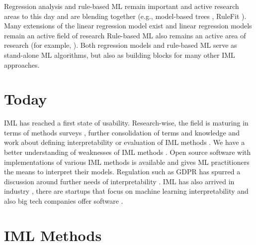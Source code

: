 \documentclass[runningheads]{llncs}
\begin{document}
Regression analysis and rule-based ML remain important and active research areas to this day and are blending together (e.g., model-based trees \cite{zeileis2008model}, RuleFit \cite{friedman2008predictive}).
Many extensions of the linear regression model exist \cite{hastie1990generalized,fahrmeir2013multivariate,gelman2006data} and linear regression models remain an active field of research \cite{fasiolo2020scalable,caruana2015intelligible,fasiolo2020fast,ustun2016supersparse} 
Rule-based ML also remains an active area of research (for example, \cite{wang2015falling,letham2015interpretable,hothorn2015ctree}).
Both regression models and rule-based ML serve as stand-alone ML algorithms, but also as building blocks for many other IML approaches.

\section{Today}

IML has reached a first state of usability.
Research-wise, the field is maturing in terms of methods surveys  \cite{molnar2019,guidotti2018survey,vilone2020explainable,rosenfeld2019explainability,adadi2018peeking,anjomshoae2019explainable,du2019techniques,carvalho2019machine}, further consolidation of terms and knowledge \cite{hall2019systematic,doshi2017towards,murdoch2019definitions,samek2019towards,preece2018stakeholders,chromik2020taxonomy} and work about defining interpretability or evaluation of IML methods \cite{mohseni2018multidisciplinary,mohseni2018human,ribeiro2016should,hoffman2018metrics}.
We have a better understanding of weaknesses of IML methods \cite{laugel2019dangers,molnar2019,molnar2020pitfalls,hooker2019please,adebayo2018sanity,janzing2019feature,sundararajan2019many,strobl2007bias,strobl2008conditional,apley2016visualizing}.
Open source software  with implementations of various IML methods is available \cite{iml,biecek2018dalex,pedregosa2011scikit,klaise2020alibi,nori2019interpretml} and gives ML practitioners the means to interpret their models.
Regulation such as GDPR has spurred a discussion around further needs of interpretability \cite{wachter2017counterfactual}.
IML has also arrived in industry \cite{gade2019explainable}, there are startups that focus on machine learning interpretability and also big tech companies offer software \cite{exler2019if,arya2020ai,hall2017machine}.

\section{IML Methods}
\end{document}
